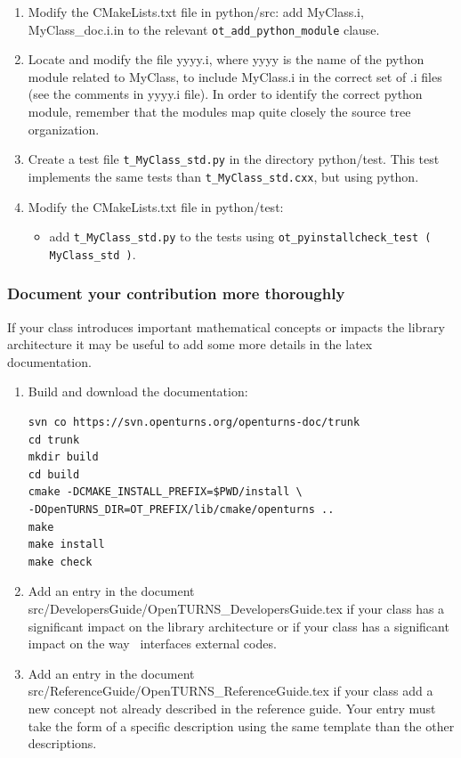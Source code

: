 \begin{enumerate}
\begin{lstlisting}
...
\end{lstlisting}

\item Modify the CMakeLists.txt file in python/src: add MyClass.i, MyClass\_doc.i.in to the relevant \verb!ot_add_python_module! clause.

\item Locate and modify the file yyyy.i, where yyyy is the name of the python module related to MyClass, to include MyClass.i in the correct set of .i files (see the comments in yyyy.i file). In order to identify the correct python module, remember that the modules map quite closely the source tree organization.

\item Create a test file \verb!t_MyClass_std.py! in the directory python/test. This test implements the same tests than \verb!t_MyClass_std.cxx!, but using python.

\item Modify the CMakeLists.txt file in python/test:
\begin{itemize}
\item add \verb!t_MyClass_std.py! to the tests using \verb!ot_pyinstallcheck_test ( MyClass_std )!.
\end{itemize}
\setcounter{oldenumi}{\value{enumi}}
\end{enumerate}

\subsubsection{Document your contribution more thoroughly}

If your class introduces important mathematical concepts or impacts the library architecture it may be useful to add some more details in the latex documentation.

\begin{enumerate}
\setcounter{enumi}{\value{oldenumi}}

\item Build and download the documentation:
\begin{lstlisting}
svn co https://svn.openturns.org/openturns-doc/trunk
cd trunk
mkdir build
cd build
cmake -DCMAKE_INSTALL_PREFIX=$PWD/install \
-DOpenTURNS_DIR=OT_PREFIX/lib/cmake/openturns ..
make
make install
make check
\end{lstlisting}

\item Add an entry in the document src/DevelopersGuide/OpenTURNS\_DevelopersGuide.tex if your class has a significant impact on the library architecture or if your class has a significant impact on the way \OT\ interfaces external codes.

\item Add an entry in the document src/ReferenceGuide/OpenTURNS\_ReferenceGuide.tex if your class add a new concept not already described in the reference guide. Your entry must take the form of a specific description using the same template than the other descriptions.
\setcounter{oldenumi}{\value{enumi}}
\end{enumerate}

